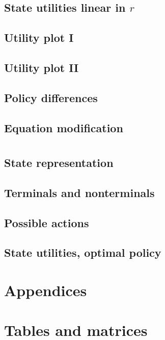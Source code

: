 \documentclass[letterpaper, 10pt]{article}
\begin{document}
\begin{multicols}{2}
\subsection{State utilities linear in $r$}

\subsection{Utility plot I}

\subsection{Utility plot II}

\subsection{Policy differences}

\subsection{Equation modification}


\section{}
\subsection{State representation}

\subsection{Terminals and nonterminals}

\subsection{Possible actions}

\subsection{State utilities, optimal policy}

\end{multicols}

\clearpage
\appendix
\section*{Appendices}
\section{Tables and matrices}
\end{document}
